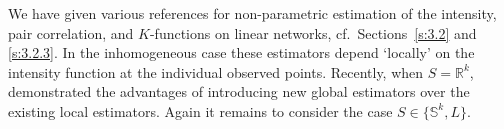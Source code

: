 \documentclass[alpha-refs]{wiley-article}
\begin{document}
We have given various references for non-parametric estimation of the intensity, pair correlation, and $K$-functions on linear networks, cf.\ Sections~\ref{s:3.2} and \ref{s:3.2.3}. In the inhomogeneous case these estimators depend `locally' on the intensity function at the individual
observed points. Recently, when $S=\mathbb R^k$, \citet{ShawEtAl} demonstrated the advantages of introducing new global estimators over the
existing local estimators. Again it remains to consider the case $S\in\{\mathbb S^k,L\}$.















\end{document}
